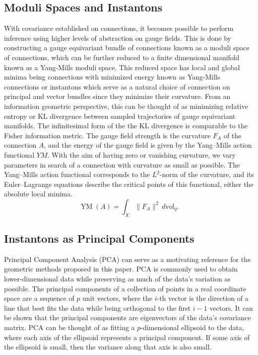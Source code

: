 \documentclass{article}
\begin{document}
    
\subsection{Moduli Spaces and Instantons}
    With covariance established on connections, it becomes possible to perform inference using higher levels of abstraction on gauge fields. This is done by constructing a gauge equivariant bundle of connections known as a moduli space of connections, which can be further reduced to a finite dimensional manifold known as a Yang-Mills moduli space. This reduced space has local and global minima being connections with minimized energy known as Yang-Mills connections or instantons which serve as a natural choice of connection on principal and vector bundles since they minimize their curvature. From an information geometric perspective, this can be thought of as minimizing relative entropy or KL divergence between sampled trajectories of gauge equivariant manifolds. The infinitesimal form of the the KL divergence is comparable to the Fisher information metric. The gauge field strength is the curvature $F_{A}$ of the connection $A$, and the energy of the gauge field is given by the Yang–Mills action functional $YM$. With the aim of having zero or vanishing curvature, we vary parameters in search of a connection with curvature as small as possible. The Yang–Mills action functional corresponds to the $L^{2}$-norm of the curvature, and its Euler–Lagrange equations describe the critical points of this functional, either the absolute  local minima.   
    \begin{equation}
         {\displaystyle \operatorname {YM} (A)=\int _{X}\|F_{A}\|^{2}\,d\mathrm {vol} _{g}.}
    \end{equation}
    
    \subsection{Instantons as Principal Components}
    Principal Component Analysis (PCA) can serve as a motivating reference for the geometric methods proposed in this paper. PCA is commonly used to obtain lower-dimensional data while preserving as much of the data's variation as possible. The principal components of a collection of points in a real coordinate space are a sequence of $p$ unit vectors, where the $i$-th vector is the direction of a line that best fits the data while being orthogonal to the first $i-1$ vectors.  It can be shown that the principal components are eigenvectors of the data's covariance matrix. PCA can be thought of as fitting a $p$-dimensional ellipsoid to the data, where each axis of the ellipsoid represents a principal component. If some axis of the ellipsoid is small, then the variance along that axis is also small.  
    
\end{document}
